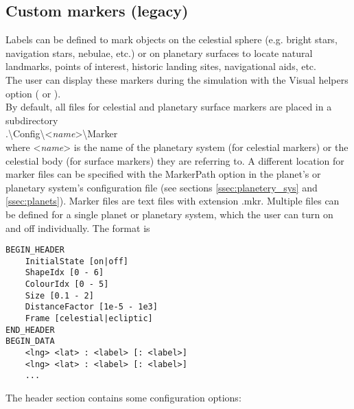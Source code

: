 \documentclass[Orbiter Developer Manual.tex]{subfiles}
\begin{document}
\subsection{Custom markers (legacy)}

\noindent
Labels can be defined to mark objects on the celestial sphere (e.g. bright stars, navigation stars, nebulae, etc.) or on planetary surfaces to locate natural landmarks, points of interest, historic landing sites, navigational aids, etc.\\
The user can display these markers during the simulation with the Visual helpers option ( or \Ctrl{}).\\
By default, all files for celestial and planetary surface markers are placed in a subdirectory\\
\indent .\textbackslash Config\textbackslash <\textit{name}>\textbackslash Marker\\
where <\textit{name}> is the name of the planetary system (for celestial markers) or the celestial body (for surface markers) they are referring to. A different location for marker files can be specified with the MarkerPath option in the planet’s or planetary system’s configuration file (see sections \ref{ssec:planetery_sys} and \ref{ssec:planets}). Marker files are text files with extension .mkr. Multiple files can be defined for a single planet or planetary system, which the user can turn on and off individually. The format is

\begin{lstlisting}[language=OSFS]
BEGIN_HEADER
	InitialState [on|off]
	ShapeIdx [0 - 6]
	ColourIdx [0 - 5]
	Size [0.1 - 2]
	DistanceFactor [1e-5 - 1e3]
	Frame [celestial|ecliptic]
END_HEADER
BEGIN_DATA
	<lng> <lat> : <label> [: <label>]
	<lng> <lat> : <label> [: <label>]
	...
\end{lstlisting}

\noindent
The header section contains some configuration options:
\end{document}
